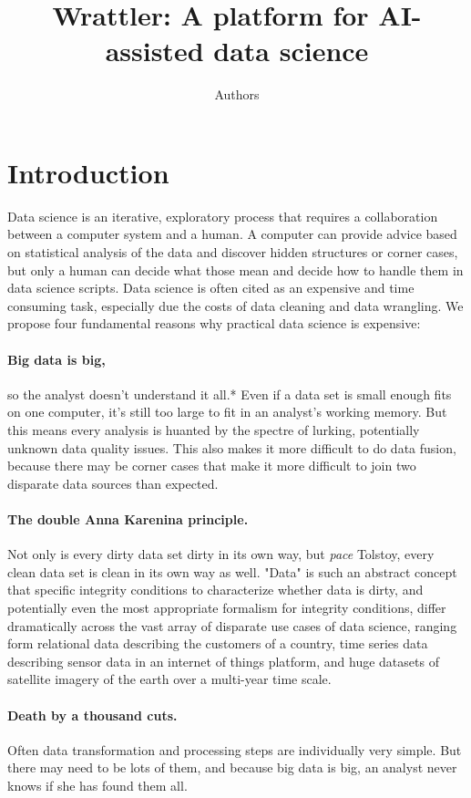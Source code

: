 \documentclass[sigplan,preprint,10pt]{acmart}\settopmatter{printfolios=true,printccs=false,printacmref=false}
\title{Wrattler: \textnormal{A platform for AI-assisted data science}}
\author{Authors}
\theoremstyle{plain}
\theoremstyle{definition}
\begin{document}
\maketitle

\section{Introduction}
Data science is an iterative, exploratory process that requires a collaboration between a 
computer system and a human. A computer can provide advice based on statistical analysis of the 
data and discover hidden structures or corner cases, but only a human can decide what those mean
and decide how to handle them in data science scripts. Data science is often cited as an expensive
and time consuming task, especially due the costs of data cleaning and data wrangling.
We propose four fundamental reasons why
practical data science is expensive:

\paragraph{Big data is big,} 
so the analyst doesn't understand it all.*
Even if a data set is small enough fits on one computer, it's still too large to fit in 
an analyst's working memory.
But this means every analysis is huanted
by the spectre of lurking, potentially
unknown data quality  issues.
This also makes it more difficult to do data fusion, because there may be corner cases that make it more difficult to join two disparate data sources than expected.

\paragraph{The double Anna Karenina principle.}
Not only is every dirty data set  dirty in its own way, but \emph{pace} Tolstoy, every clean data set is clean in its own way as well. 
"Data" is such an abstract concept that specific integrity conditions to characterize whether data is dirty, and potentially even the most appropriate formalism for integrity conditions,  differ dramatically across
the vast array of disparate use cases of data science,
ranging form relational data describing the customers of a country, time series data describing sensor data in an internet of things platform, and huge datasets of satellite imagery of the earth over a multi-year time scale.

\paragraph{Death by a thousand cuts.} 
Often data transformation and processing steps are individually  very simple. But  there may need to be lots of them, and
because big data is big,
an analyst never knows if she has found them all.
\end{document}
